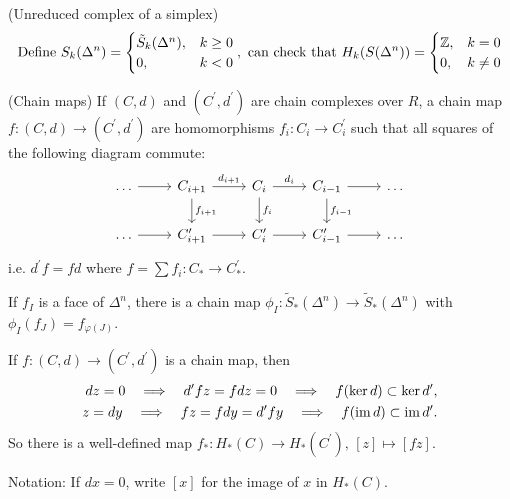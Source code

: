 \documentclass[a4paper,11pt]{article}
\begin{document}
			\begin{eg}(Unreduced complex of a simplex)
				\begin{equation*}
					\text{Define }S_{k}(\Delta^{n})=\begin{cases}
						\tilde{S}_k(\Delta^{n}), & k\ge0\\ 0, & k<0
					\end{cases},\text{ can check that }H_{k}(S(\Delta^{n}))=\begin{cases}
						\mathbb{Z}, & k=0\\ 0, & k\neq 0
					\end{cases}
				\end{equation*}
			\end{eg}

			\begin{defi}(Chain maps)
				If $(C,d)$ and $(C ^{\prime},d ^{\prime})$ are chain complexes over $R$, a chain map $f:(C,d)\rightarrow (C ^{\prime},d ^{\prime})$ are homomorphisms $f_i:C_i \rightarrow C_i ^{\prime}$ such that all squares of the following diagram commute:
				\begin{equation*}
					\begin{tikzcd}
						\phantom{A}\dots\ar[r] & C_{i+1}\ar[d,"f_{i+1}"]\ar[r,"d_{i+1}"] & C_i\ar[d,"f_i"]\ar[r,"d_{i}"] & C_{i-1}\ar[d,"f_{i-1}"]\ar[r]&\dots\phantom{A}\\
						\phantom{A}\dots\ar[r] & C_{i+1}^{\prime}\ar[r] & C_{i}^{\prime}\ar[r] & C_{i-1}^{\prime}\ar[r] &\dots\phantom{A}
					\end{tikzcd}
				\end{equation*}
				i.e. $d ^{\prime}f=fd$ where $f=\sum f_i:C_\ast \rightarrow C_\ast ^{\prime}$.
			\end{defi}

			\begin{eg}
				If $f_I$ is a face of $\Delta^{n}$, there is a chain map $\phi_I:\tilde{S}_\ast(\Delta^{n})\rightarrow \tilde{S}_\ast(\Delta^{n})$ with $\phi_I(f_J)=f_{\varphi(J)}$.

				If $f:(C,d)\rightarrow (C ^{\prime},d ^{\prime})$ is a chain map, then 
				\begin{align*}
					d z=0\quad\Longrightarrow\quad d ^{\prime}fz=fdz=0\quad\Longrightarrow\quad f(\ker d)\subset\ker d ^{\prime},\\
					z=d y\quad\Longrightarrow\quad fz=fdy=d ^{\prime}fy\quad\Longrightarrow\quad f(\operatorname{im} d)\subset \operatorname{im} d ^{\prime}.				
				\end{align*}
				So there is a well-defined map $f_\ast:H_\ast(C)\rightarrow H_\ast(C ^{\prime}),\,[z]\mapsto[fz]$.
			\end{eg}
			Notation: If $dx=0$, write $[x]$ for the image of $x$ in $H_\ast(C)$.
\end{document}
